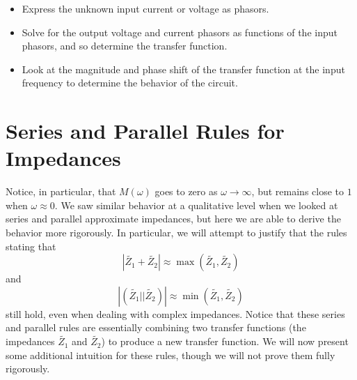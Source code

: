 \documentclass[letterpaper]{article}
\theoremstyle{remark}
\renewcommand{\tilde}[1]{\widetilde{#1}}
\begin{document}
\begin{itemize}
    \item Express the unknown input current or voltage as phasors.
    \item Solve for the output voltage and current phasors as functions of the input phasors, and so determine the transfer function.
    \item Look at the magnitude and phase shift of the transfer function at the input frequency to determine the behavior of the circuit.
\end{itemize}


\section{Series and Parallel Rules for Impedances}
Notice, in particular, that $M(\omega)$ goes to zero as $\omega \to \infty$, but remains close to $1$ when $\omega \approx 0$. We saw similar behavior at a qualitative level when we looked at series and parallel approximate impedances, but here we are able to derive the behavior more rigorously. In particular, we will attempt to justify that the rules stating that
\[
    |\tilde{Z_1} + \tilde{Z_2}| \approx \max{(\tilde{Z_1}, \tilde{Z_2})}
\]
and
\[
    |(\tilde{Z_1} || \tilde{Z_2})| \approx \min{(\tilde{Z_1}, \tilde{Z_2})}
\]
still hold, even when dealing with complex impedances. Notice that these series and parallel rules are essentially combining two transfer functions (the impedances $\tilde{Z_1}$ and $\tilde{Z_2}$) to produce a new transfer function. We will now present some additional intuition for these rules, though we will not prove them fully rigorously.
\end{document}
